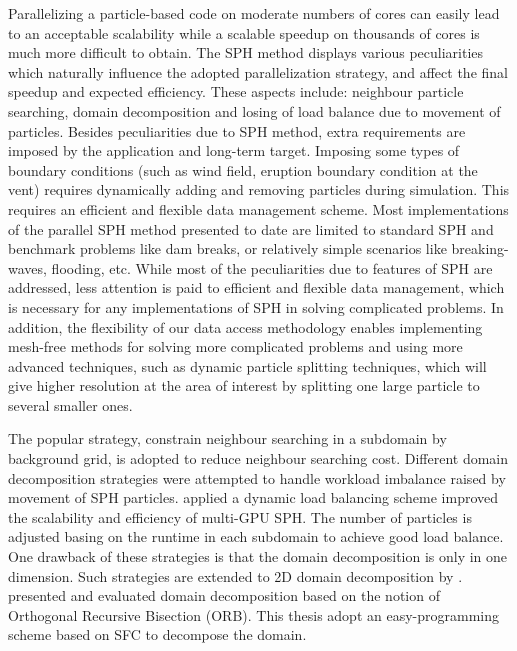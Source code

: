 Parallelizing a particle-based code on moderate numbers of cores can easily lead to an acceptable scalability while a scalable speedup on thousands of cores is much more difficult to obtain. The SPH method displays various peculiarities which naturally influence the adopted parallelization strategy, and affect the final speedup and expected efficiency. These aspects include: neighbour particle searching, domain decomposition and losing of load balance due to movement of particles. Besides peculiarities due to SPH method, extra requirements are imposed by the application and long-term target. Imposing some types of boundary conditions (such as wind field, eruption boundary condition at the vent) requires dynamically adding and removing particles during simulation. This requires an efficient and flexible data management scheme. Most implementations of the parallel SPH method presented to date are limited to standard SPH and benchmark problems like dam breaks, or relatively simple scenarios like breaking-waves, flooding, etc. While most of the peculiarities due to features of SPH are addressed, less attention is paid to efficient and flexible data management, which is necessary for any implementations of SPH in solving complicated problems. In addition, the flexibility of our data access methodology enables implementing mesh-free methods for solving more complicated problems and using more advanced techniques, such as dynamic particle splitting techniques\cite{vacondio2012accurate, feldman2007dynamic}, which will give higher resolution at the area of interest by splitting one large particle to several smaller ones.

The popular strategy, constrain neighbour searching in a subdomain by background grid, is adopted to reduce neighbour searching cost. Different domain decomposition strategies were attempted to handle workload imbalance raised by movement of SPH particles. \citet{dominguez2013new} applied a dynamic load balancing scheme improved the scalability and efficiency of multi-GPU SPH. The number of particles is adjusted basing on the runtime in each subdomain to achieve good load balance. One drawback of these strategies is that the domain decomposition is only in one dimension. Such strategies are extended to 2D domain decomposition by \citet{rustico2014advances}. \citet{oger2016distributed} presented and evaluated domain decomposition based on the notion of Orthogonal Recursive Bisection (ORB). This thesis adopt an easy-programming scheme based on SFC \cite{patra1999efficient} to decompose the domain.

